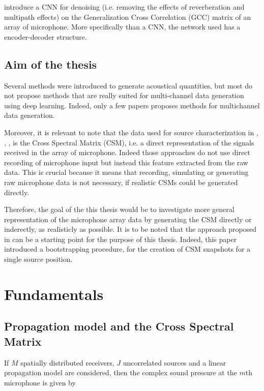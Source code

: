 \documentclass[11pt,a4paper,twoside]{report}
\begin{document}
\cite{vera2021acoustic} introduce a CNN for denoising (i.e. removing the effects of reverberation and multipath effects) on the Generalization Cross Correlation (GCC) matrix of an array of microphone. More specifically than a CNN, the network used has a encoder-decoder structure.

\section{Aim of the thesis}

Several methods were introduced to generate acoustical quantities, but most do not propose methods that are really suited for multi-channel data generation using deep learning. Indeed, only a few papers proposes methods for multichannel data generation. 

Moreover, it is relevant to note that the data used for source characterization in \cite{castellini2021neural}, \cite{lee2021deep}, \cite{ma2019phased}, \cite{xu2021deep} is the Cross Spectral Matrix (CSM), i.e. a direct representation of the signals received in the array of microphone. Indeed those approaches do not use direct recording of microphone input but instead this feature extracted from the raw data. This is crucial because it means that recording, simulating or generating raw microphone data is not necessary, if realistic CSMs could be generated directly. 

Therefore, the goal of the this thesis would be to investigate more general representation of the microphone array data by generating the CSM directly or inderectly, as realisticly as possible. It is to be noted that the approach proposed in \cite{gerstoft2020parametric} can be a starting point for the purpose of this thesis. Indeed, this paper introduced a bootstrapping procedure, for the creation of CSM snapshots for a single source position.

\chapter{Fundamentals}

\section{Propagation model and the Cross Spectral Matrix}

If $M$ spatially distributed receivers, $J$ uncorrelated sources and a linear propagation model are considered, then the complex sound pressure at the $m$th microphone is given by
\end{document}
